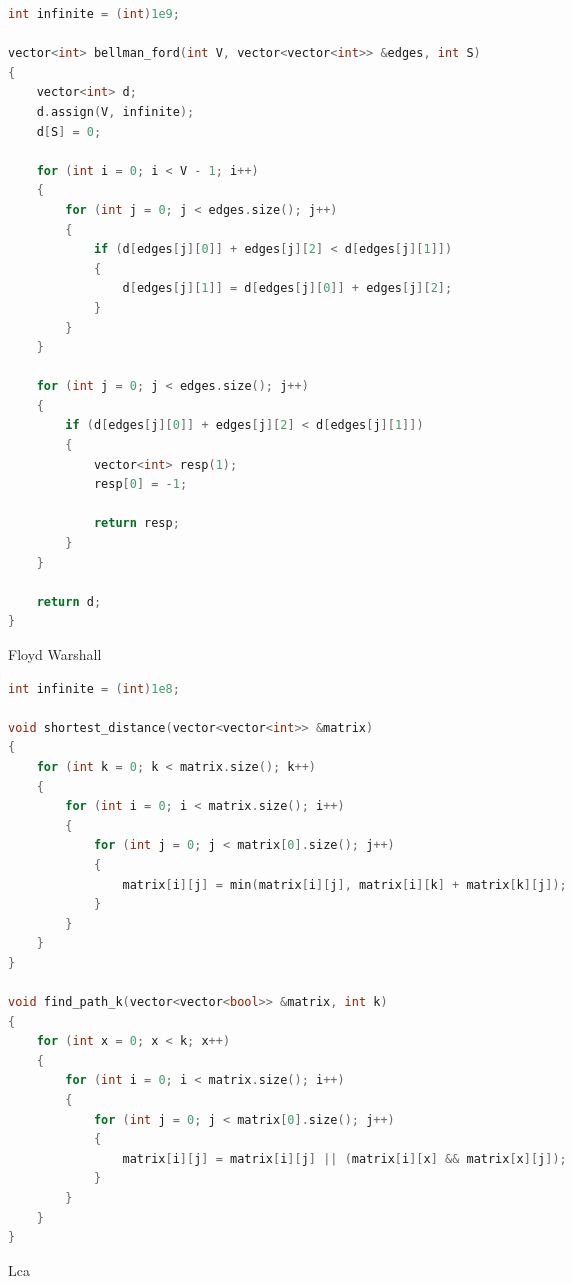 \documentclass[leter]{amsart}
\begin{document}
\begin{multicols}{2}
\begin{lstlisting}[language=C++]
int infinite = (int)1e9;

vector<int> bellman_ford(int V, vector<vector<int>> &edges, int S)
{
    vector<int> d;
    d.assign(V, infinite);
    d[S] = 0;

    for (int i = 0; i < V - 1; i++)
    {
        for (int j = 0; j < edges.size(); j++)
        {
            if (d[edges[j][0]] + edges[j][2] < d[edges[j][1]])
            {
                d[edges[j][1]] = d[edges[j][0]] + edges[j][2];
            }
        }
    }

    for (int j = 0; j < edges.size(); j++)
    {
        if (d[edges[j][0]] + edges[j][2] < d[edges[j][1]])
        {
            vector<int> resp(1);
            resp[0] = -1;

            return resp;
        }
    }

    return d;
}

\end{lstlisting}
\end{multicols}
Floyd Warshall
\begin{multicols}{2}
\begin{lstlisting}[language=C++]
int infinite = (int)1e8;

void shortest_distance(vector<vector<int>> &matrix)
{
    for (int k = 0; k < matrix.size(); k++)
    {
        for (int i = 0; i < matrix.size(); i++)
        {
            for (int j = 0; j < matrix[0].size(); j++)
            {
                matrix[i][j] = min(matrix[i][j], matrix[i][k] + matrix[k][j]);
            }
        }
    }
}

void find_path_k(vector<vector<bool>> &matrix, int k)
{
    for (int x = 0; x < k; x++)
    {
        for (int i = 0; i < matrix.size(); i++)
        {
            for (int j = 0; j < matrix[0].size(); j++)
            {
                matrix[i][j] = matrix[i][j] || (matrix[i][x] && matrix[x][j]);
            }
        }
    }
}

\end{lstlisting}
\end{multicols}
Lca
\end{document}
